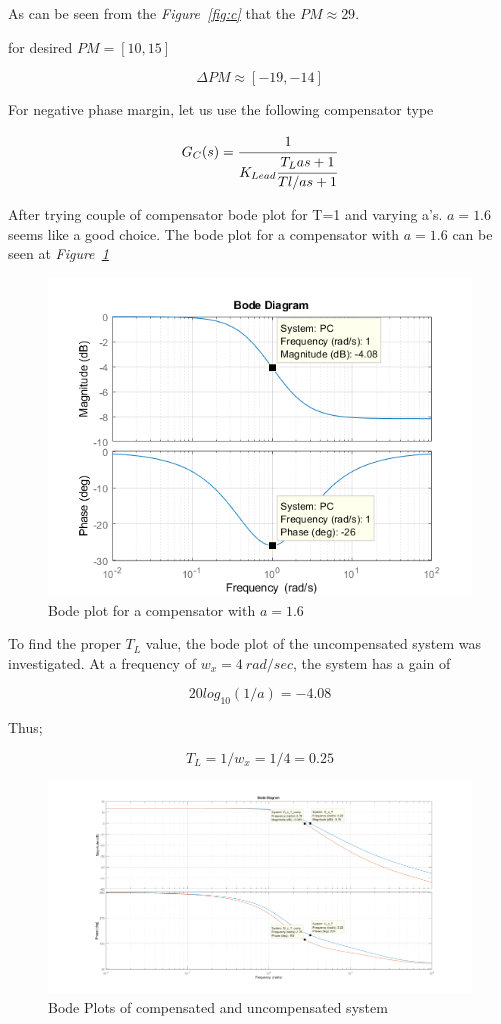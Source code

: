 \documentclass[a4paper,12pt]{article}
\begin{document}
\begin{enumerate}
	As can be seen from the \textit{Figure~\ref{fig:c}} that the $ PM \approx 29$.
	
	
	for desired $PM=[10,15]$
	
	$$ \Delta PM \approx [-19,-14] $$
	
	For negative phase margin, let us use the following compensator type
	
	$$ G_C(s)=\cfrac{1}{K_{Lead}\cfrac{T_Las+1}{Tl/as+1}} $$
	
	After trying couple of compensator bode plot for T=1 and varying a's. $ a=1.6 $ seems like a good choice. The bode plot for a compensator with $a=1.6$ can be seen at \textit{Figure~\ref{fig:d}} 
	
	\begin{figure}[H]
			\center
			\setlength{\unitlength}{\textwidth} 
		\includegraphics[width=0.75\unitlength]{images/desired_a1}
  		\caption{\label{fig:d}Bode plot for a compensator with $a=1.6$}
	\end{figure}
	
	To find the proper $T_L$ value, the bode plot of the uncompensated system was investigated. At a frequency of $w_x=4\ rad/sec$, the system has a gain of
	
	$$ 20log_{10}(1/a) = -4.08$$
	
	Thus;
	
	$$ T_L=1/w_x=1/4=0.25 $$
	
	\begin{figure}[H]
			\center
			\setlength{\unitlength}{\textwidth} 
		\includegraphics[width=1.0\unitlength]{images/comped1}
  		\caption{\label{fig:e}Bode Plots of compensated and uncompensated system}
	\end{figure}
	

\end{enumerate}
\end{document}
